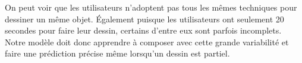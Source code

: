 On peut voir que les utilisateurs n'adoptent pas tous les mêmes techniques pour dessiner un même objet. 
Également puisque les utilisateurs ont seulement 20 secondes pour faire leur dessin, certains d'entre eux sont parfois incomplets.
Notre modèle doit donc apprendre à composer avec cette grande variabilité et faire une prédiction précise même lorsqu'un dessin est partiel.

